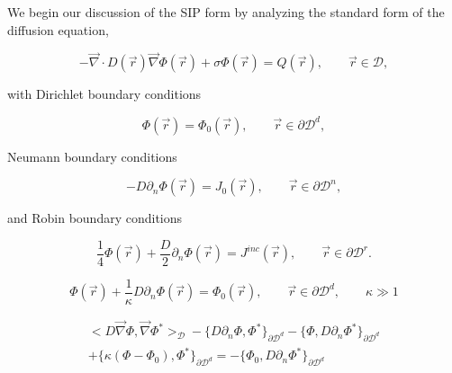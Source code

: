We begin our discussion of the SIP form by analyzing the standard form of the diffusion equation,

\begin{equation}
\label{eq::DSA_standard_diff_eq}
- \vec{\nabla}  \cdot D (\vec{r})  \vec{\nabla} \Phi (\vec{r}) + \sigma \Phi (\vec{r}) = Q (\vec{r}) , \qquad \vec{r} \in \mathcal{D} ,
\end{equation}

\noindent with Dirichlet boundary conditions

\begin{equation}
\label{eq::DSA_standard_diff_eq_dirichlet_bound}
\Phi (\vec{r}) = \Phi_0 (\vec{r}), \qquad \vec{r} \in \partial \mathcal{D}^d ,
\end{equation}

\noindent Neumann boundary conditions

\begin{equation}
\label{eq::DSA_standard_diff_eq_neumann_bound}
- D \partial_n \Phi (\vec{r}) = J_0 (\vec{r}), \qquad \vec{r} \in \partial \mathcal{D}^n ,
\end{equation}

\noindent and Robin boundary conditions

\begin{equation}
\label{eq::DSA_standard_diff_eq_robin_bound}
\frac{1}{4}\Phi (\vec{r}) + \frac{D}{2} \partial_n \Phi (\vec{r}) = J^{inc} (\vec{r}), \qquad \vec{r} \in \partial \mathcal{D}^r .
\end{equation}



\begin{equation}
\label{eq::penalty_boundary_term}
\Phi (\vec{r}) +\frac{1}{\kappa} D \partial_n \Phi (\vec{r}) = \Phi_0 (\vec{r}), \qquad \vec{r} \in \partial \mathcal{D}^d, \qquad \kappa \gg 1
\end{equation}

\begin{equation}
\label{eq::SIP_boundary_laplacian_term}
\begin{aligned}
\Big<  D \vec{\nabla}  \Phi , \vec{\nabla} \Phi^*  \Big>_{\mathcal{D}} - \Big\{   D \partial_n \Phi, \Phi^* \Big\}_{\partial \mathcal{D}^d} - \Big\{  \Phi, D \partial_n \Phi^* \Big\}_{\partial \mathcal{D}^d} \\ + \Big\{ \kappa (\Phi - \Phi_0),  \Phi^* \Big\}_{\partial \mathcal{D}^d} = - \Big\{  \Phi_0, D \partial_n \Phi^* \Big\}_{\partial \mathcal{D}^d} 
\end{aligned}
\end{equation}

